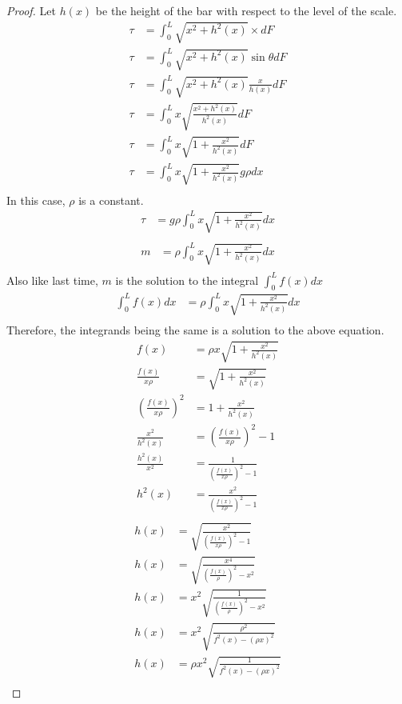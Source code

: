 \documentclass[letterpaper, 12pt]{article}
\begin{document}
\begin{proof}
    Let $h(x)$ be the height of the bar with respect to the level of the scale.
    \begin{align*}
        \tau &= \int_0^L \sqrt{x^2 + h^2(x)}\times dF\\
        \tau &= \int_0^L \sqrt{x^2 + h^2(x)}\sin\theta dF\\
        \tau &= \int_0^L \sqrt{x^2 + h^2(x)}\frac{x}{h(x)} dF\\
        \tau &= \int_0^L x\sqrt{\frac{x^2 + h^2(x)}{h^2(x)}}dF\\
        \tau &= \int_0^L x\sqrt{1 + \frac{x^2}{h^2(x)}}dF\\
        \tau &= \int_0^L x\sqrt{1 + \frac{x^2}{h^2(x)}}g\rho dx\\
    \end{align*}
    In this case, $\rho$ is a constant.
    \begin{align*}
        \tau &= g\rho\int_0^L x\sqrt{1 + \frac{x^2}{h^2(x)}}dx\\
    \end{align*}
    \begin{align*}
        m &= \rho\int_0^L x\sqrt{1 + \frac{x^2}{h^2(x)}}dx\\
    \end{align*}
    Also like last time, $m$ is the solution to the integral $\int_0^L f(x) dx$
    \begin{align*}
        \int_0^Lf(x)dx &= \rho\int_0^L x\sqrt{1 + \frac{x^2}{h^2(x)}}dx\\
    \end{align*}
    Therefore, the integrands being the same is a solution to the above equation.
    \begin{align*}
        f(x) &= \rho x\sqrt{1 + \frac{x^2}{h^2(x)}}\\
        \frac{f(x)}{x\rho} &= \sqrt{1 + \frac{x^2}{h^2(x)}}\\
        (\frac{f(x)}{x\rho})^2 &= 1 + \frac{x^2}{h^2(x)}\\
        \frac{x^2}{h^2(x)} &= (\frac{f(x)}{x\rho})^2 - 1\\
        \frac{h^2(x)}{x^2} &= \frac{1}{(\frac{f(x)}{x\rho})^2 - 1}\\
        h^2(x) &= \frac{x^2}{(\frac{f(x)}{x\rho})^2 - 1}\\
    \end{align*}
    \begin{align*}
        h(x) &= \sqrt{\frac{x^2}{(\frac{f(x)}{x\rho})^2 - 1}}\\
        h(x) &= \sqrt{\frac{x^4}{(\frac{f(x)}{\rho})^2 - x^2}}\\
        h(x) &= x^2\sqrt{\frac{1}{(\frac{f(x)}{\rho})^2 - x^2}}\\
        h(x) &= x^2\sqrt{\frac{\rho^2}{f^2(x) - (\rho x)^2}}\\
        h(x) &= \rho x^2\sqrt{\frac{1}{f^2(x) - (\rho x)^2}}\\
    \end{align*}
\end{proof}
\end{document}
